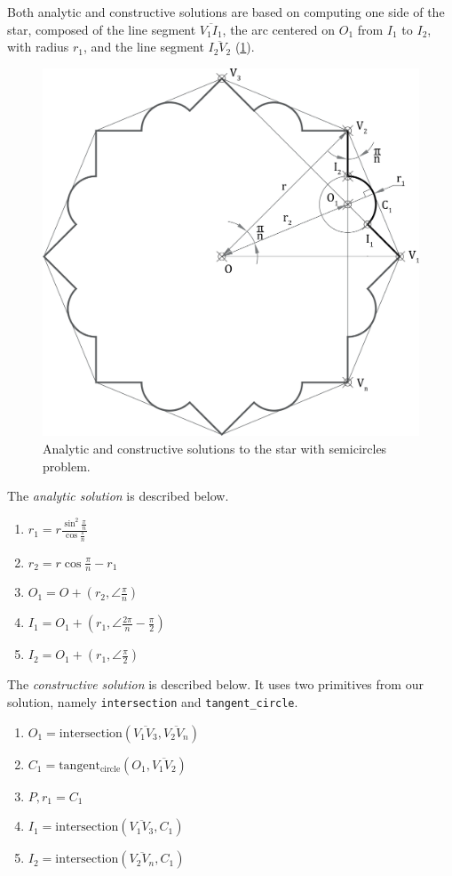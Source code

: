 Both analytic and constructive solutions are based on computing one side of the
star, composed of the line segment $\overline{V_1 I_1}$, the arc centered on
$O_1$ from $I_1$ to $I_2$, with radius $r_1$, and the line segment 
$\overline{I_2 V_2}$ (\cref{fig:eval.studies.star.sol}).

\begin{figure}[htb]
  \includegraphics[width=.7\linewidth]{fig/star-solution}
  \caption{\label{fig:eval.studies.star.sol}
    Analytic and constructive solutions to the star with semicircles problem.}%
\end{figure}

The \textit{analytic solution} is described below.

\begin{enumerate}
  \item $r_1 = r\frac{\sin^2\frac{\pi}{n}}{\cos\frac{\pi}{n}}$
  \item $r_2 = r\cos\frac{\pi}{n} - r_1$
  \item $O_1 = O + \left(r_2, \angle\frac{\pi}{n}\right)$
  \item $I_1 = O_1 + \left(r_1, \angle\frac{2\pi}{n} - \frac{\pi}{2}\right)$
  \item $I_2 = O_1 + \left(r_1, \angle\frac{\pi}{2}\right)$
\end{enumerate}

The \textit{constructive solution} is described below.  It uses two primitives
from our solution, namely \texttt{intersection} and \texttt{tangent\_circle}.

\begin{enumerate}
  \item $O_1 = \mathrm{intersection}\left(\overline{V_1 V_3}, \overline{V_2
  V_n}\right)$
  \item $C_1 = \mathrm{tangent_{circle}}\left(O_1, \overline{V_1 V_2}\right)$
  \item $P,r_1 = C_1$
  \item $I_1 = \mathrm{intersection}\left(\overline{V_1 V_3}, C_1\right)$
  \item $I_2 = \mathrm{intersection}\left(\overline{V_2 V_n}, C_1\right)$
\end{enumerate}

